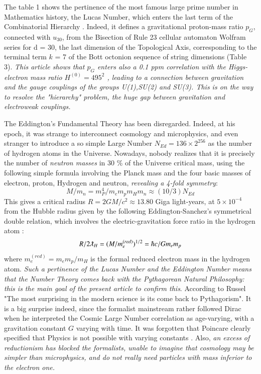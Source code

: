 \documentclass[a4paper,9pt]{article}
\newcounter{row}
\begin{document}
The table 1 shows the pertinence of the most famous large prime number in Mathematics history, the Lucas Number, which enters the last term of the Combinatorial Hierarchy \cite{Bastin} \cite{Noyes}. Indeed, it defines a gravitational proton-mass ratio $p_G$, connected with $u_{30}$, from the Bisection of Rule 23 cellular automaton Wolfram series \cite{tHooft} for d = 30, the last dimension of the Topological Axis, corresponding to the terminal term $k$ = 7 of the Bott octonion sequence of string dimensions (Table 3). \textit {This article shows that $p_G$ enters also a 0.1 ppm correlation with the Higgs-electron mass ratio $ H^{(0)}= 495^2$ \cite{Sanchez2}, leading to a connection between gravitation and the gauge couplings of the groups U(1),SU(2) and SU(3). This is on the way to resolve the "hierarchy" problem, the huge gap between gravitation and electroweak couplings.} 

The Eddington's Fundamental Theory \cite{Eddington} has been disregarded. Indeed, at his epoch, it was strange to interconnect cosmology and microphysics, and even stranger to introduce a so simple Large Number $ N_{Ed} = 136 \times 2^{256}$ as the number of hydrogen atoms in the Universe. Nowadays, nobody realizes that it is precisely the number of \textit{neutron masses} in 30 \% of the Universe critical mass, using the following simple formula involving the Planck mass and the four basic masses of electron, proton, Hydrogen and neutron, \textit{revealing a 4-fold symmetry}: 
\begin{equation}
M/m_n = m_P^4/m_e m_p m_H m_n \approx (10/3)N_{Ed} 
 \end{equation}
This gives a critical radius $R = 2GM/c^2\approx 13.80$ Giga light-years, at $5 \times 10^{-4} $ from the Hubble radius given by the following Eddington-Sanchez's symmetrical double relation, which involves the electric-gravitation force ratio in the hydrogen atom \cite {Sanchez2}:
\begin{equation}
R/2\lambdabar_H = (M/m_e^{(red)})^{1/2} = \hbar c / G m_e m_p 
 \end{equation}
where $ m_e^{(red)} = m_e m_p/m_H$ is the formal reduced electron mass in the hydrogen atom. \textit {Such a pertinence of the Lucas Number and the Eddington Number means that the Number Theory comes back with the Pythagorean Natural Philosophy: this is the main goal of the present article to confirm this}. According to Russel "The most surprising in the modern science is its come back to Pythagorism"\cite{Alcina}. It is a big surprise indeed, since the formalist mainstream rather followed Dirac when he interpreted the Cosmic Large Number correlation as age-varying, with a gravitation constant $G$ varying with time. It was forgotten that Poincare clearly specified that Physics is not possible with varying constants \cite{Poincare2}. Also, \textit{an excess of reductionism has blocked the formalists, unable to imagine that cosmology may be simpler than microphysics, and do not really need particles with mass inferior to the electron one.}
\end{document}
